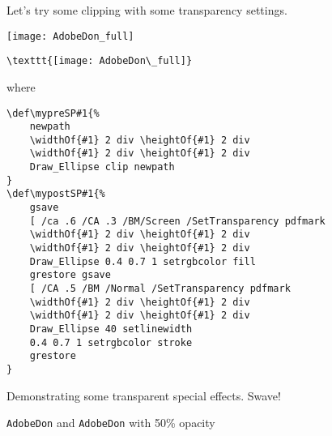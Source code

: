 \documentclass{article}
\begin{document}
\def\mypreSP#1{%
    newpath
    \widthOf{#1} 2 div \heightOf{#1} 2 div
    \widthOf{#1} 2 div \heightOf{#1} 2 div
    Draw_Ellipse
    clip
    newpath
}
\def\mypostSP#1{%
    gsave
    [ /ca .6 /CA .3 /BM/Screen /SetTransparency pdfmark
    \widthOf{#1} 2 div \heightOf{#1} 2 div
    \widthOf{#1} 2 div \heightOf{#1} 2 div
    Draw_Ellipse
    0.4 0.7 1 setrgbcolor
    fill
    grestore
    gsave
    [ /CA .5 /BM /Normal /SetTransparency pdfmark
    \widthOf{#1} 2 div \heightOf{#1} 2 div
    \widthOf{#1} 2 div \heightOf{#1} 2 div
    Draw_Ellipse
    40 setlinewidth
    0.4 0.7 1 setrgbcolor
    stroke
    grestore
}

\medskip
Let's try some clipping with some transparency settings.

\medskip
\begin{minipage}{1.6in}
\begin{center}
\texttt{[image: AdobeDon\_full]}
\end{center}
\end{minipage}\hfill
\begin{minipage}{\linewidth-1.6in}\scriptsize
\begin{verbatim}
\texttt{[image: AdobeDon\_full]}
\end{verbatim}
{\normalsize where}
\begin{verbatim}
\def\mypreSP#1{%
    newpath
    \widthOf{#1} 2 div \heightOf{#1} 2 div
    \widthOf{#1} 2 div \heightOf{#1} 2 div
    Draw_Ellipse clip newpath
}
\def\mypostSP#1{%
    gsave
    [ /ca .6 /CA .3 /BM/Screen /SetTransparency pdfmark
    \widthOf{#1} 2 div \heightOf{#1} 2 div
    \widthOf{#1} 2 div \heightOf{#1} 2 div
    Draw_Ellipse 0.4 0.7 1 setrgbcolor fill
    grestore gsave
    [ /CA .5 /BM /Normal /SetTransparency pdfmark
    \widthOf{#1} 2 div \heightOf{#1} 2 div
    \widthOf{#1} 2 div \heightOf{#1} 2 div
    Draw_Ellipse 40 setlinewidth
    0.4 0.7 1 setrgbcolor stroke
    grestore
}
\end{verbatim}
\end{minipage}
Demonstrating some transparent special effects. Swave!

\newpage

\null\vfil
\begin{center}
\texttt{AdobeDon} and \texttt{AdobeDon} with 50\% opacity\\[1ex]
 
\end{center}
\end{document}
